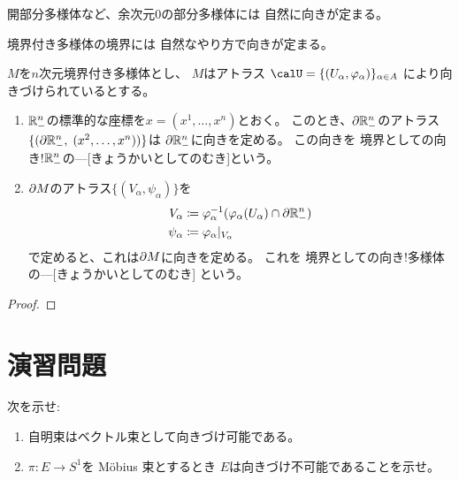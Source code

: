 \documentclass[report]{jlreq}
\begin{document}
開部分多様体など、余次元$0$の部分多様体には
自然に向きが定まる。

\begin{definition}
    \TODO{}
\end{definition}

境界付き多様体の境界には
自然なやり方で向きが定まる。

\begin{definition}[境界としての向き]
    $M$を$n$次元境界付き多様体とし、
    $M$はアトラス
    $\calU = \{ (U_\alpha, \varphi_\alpha) \}_{\alpha \in A}$
    により向きづけられているとする。
    \begin{enumerate}
        \item $\mathbb{R}^n_-$の標準的な座標を$x = (x^1, \dots, x^n)$とおく。
            このとき、$\partial\mathbb{R}^n_-$のアトラス
            $\{ (\partial\mathbb{R}^n_-, \; (x^2, \dots, x^n)) \}$は
            $\partial\mathbb{R}^n_-$に向きを定める。
            この向きを
            {境界としての向き!$\mathbb{R}^n_-$の---}[きょうかいとしてのむき]という。
        \item
            $\partial M$のアトラス$\{ (V_\alpha, \psi_\alpha) \}$を
            \begin{alignat}{1}
                V_\alpha &\coloneqq
                    \varphi_\alpha^{-1}(\varphi_\alpha(U_\alpha) \cap \partial\mathbb{R}^n_-) \\
                \psi_\alpha &\coloneqq
                    \varphi_\alpha |_{V_\alpha}
            \end{alignat}
            で定めると、これは$\partial M$に向きを定める。
            これを
            {境界としての向き!多様体の---}[きょうかいとしてのむき]
            という。
    \end{enumerate}
\end{definition}

\begin{proof}
    \TODO{}
\end{proof}



%
\newpage
\section{演習問題}

\begin{problem}[幾何学III 問4.1.6]
    次を示せ:
    \begin{enumerate}
        \item 自明束はベクトル束として向きづけ可能である。
        \item $\pi \colon E \to S^1$を M\"{o}bius 束とするとき
            $E$は向きづけ不可能であることを示せ。
    \end{enumerate}
\end{problem}
\end{document}

